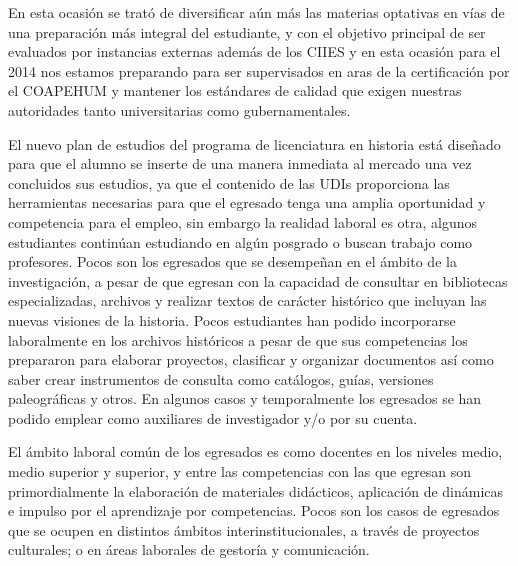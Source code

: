 En esta ocasión se trató de diversificar aún más las materias optativas 
en vías de una preparación más integral del estudiante, y con el 
objetivo principal de ser evaluados por instancias externas además de 
los CIIES y en esta ocasión para el 2014 nos estamos preparando para 
ser supervisados en aras de la certificación por el COAPEHUM y mantener 
los estándares de calidad que exigen nuestras autoridades tanto 
universitarias como gubernamentales.

El nuevo plan de estudios del programa de licenciatura en historia está 
diseñado para que el alumno se inserte de una manera inmediata al 
mercado una vez concluidos sus estudios, ya que el contenido de las 
UDIs proporciona las herramientas necesarias para que el egresado tenga 
una amplia oportunidad y competencia para el empleo, sin embargo la 
realidad laboral es otra, algunos estudiantes continúan estudiando en 
algún posgrado o buscan trabajo como profesores. Pocos son los 
egresados que se desempeñan en el ámbito de la investigación, a pesar 
de que egresan con la capacidad de consultar en bibliotecas 
especializadas, archivos y realizar textos de carácter histórico que 
incluyan las nuevas visiones de la historia. Pocos estudiantes han 
podido incorporarse laboralmente en los  archivos históricos a pesar de 
que sus competencias los prepararon para elaborar proyectos, clasificar 
y organizar documentos así como saber crear instrumentos de consulta 
como catálogos, guías, versiones paleográficas y otros. En algunos 
casos y temporalmente los egresados se han podido emplear como 
auxiliares de investigador y/o por su cuenta.  

El ámbito laboral común de los egresados es como docentes en los 
niveles medio, medio superior y superior, y entre las competencias con 
las que egresan son primordialmente la elaboración de materiales 
didácticos, aplicación de dinámicas e impulso por  el aprendizaje por 
competencias. Pocos son los casos de egresados que se ocupen en 
distintos ámbitos interinstitucionales, a través de proyectos 
culturales; o en áreas laborales de gestoría y comunicación.  

